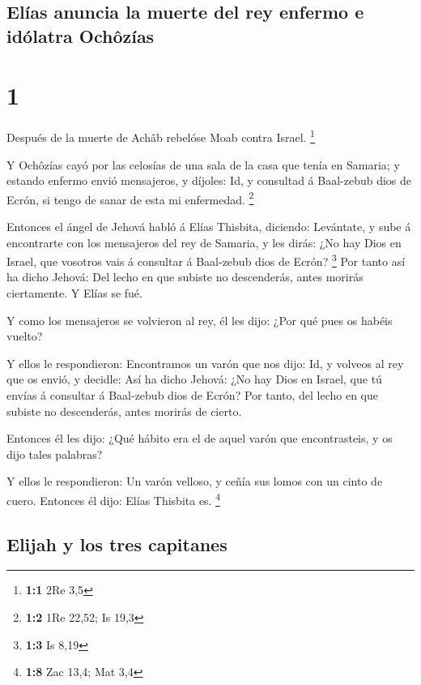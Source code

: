 \hypertarget{eluxedas-anuncia-la-muerte-del-rey-enfermo-e-iduxf3latra-ochuxf4zuxedas}{%
\subsection{Elías anuncia la muerte del rey enfermo e idólatra
Ochôzías}\label{eluxedas-anuncia-la-muerte-del-rey-enfermo-e-iduxf3latra-ochuxf4zuxedas}}

\hypertarget{section}{%
\section{1}\label{section}}

 Después de la muerte de Achâb rebelóse Moab contra
Israel. \footnote{\textbf{1:1} 2Re 3,5}

 Y Ochôzías cayó por las celosías de una sala de la casa
que tenía en Samaria; y estando enfermo envió mensajeros, y díjoles: Id,
y consultad á Baal-zebub dios de Ecrón, si tengo de sanar de esta mi
enfermedad. \footnote{\textbf{1:2} 1Re 22,52; Is 19,3}

 Entonces el ángel de Jehová habló á Elías Thisbita,
diciendo: Levántate, y sube á encontrarte con los mensajeros del rey de
Samaria, y les dirás: ¿No hay Dios en Israel, que vosotros vais á
consultar á Baal-zebub dios de Ecrón? \footnote{\textbf{1:3} Is 8,19}
 Por tanto así ha dicho Jehová: Del lecho en que subiste
no descenderás, antes morirás ciertamente. Y Elías se fué.

 Y como los mensajeros se volvieron al rey, él les dijo:
¿Por qué pues os habéis vuelto?

 Y ellos le respondieron: Encontramos un varón que nos
dijo: Id, y volveos al rey que os envió, y decidle: Así ha dicho Jehová:
¿No hay Dios en Israel, que tú envías á consultar á Baal-zebub dios de
Ecrón? Por tanto, del lecho en que subiste no descenderás, antes morirás
de cierto.

 Entonces él les dijo: ¿Qué hábito era el de aquel varón
que encontrasteis, y os dijo tales palabras?

 Y ellos le respondieron: Un varón velloso, y ceñía sus
lomos con un cinto de cuero. Entonces él dijo: Elías Thisbita es.
\footnote{\textbf{1:8} Zac 13,4; Mat 3,4}

\hypertarget{elijah-y-los-tres-capitanes}{%
\subsection{Elijah y los tres
capitanes}\label{elijah-y-los-tres-capitanes}}

